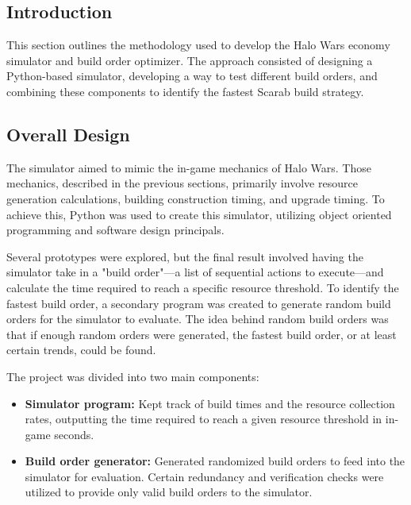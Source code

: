 \documentclass[a4paper, 12pt, english]{article}
\begin{document}
\subsection{Introduction}
This section outlines the methodology used to develop the Halo Wars economy simulator and build order optimizer. The approach consisted of designing a Python-based simulator, developing a way to test different build orders, and combining these components to identify the fastest Scarab build strategy.
\newline

\subsection{Overall Design}
The simulator aimed to mimic the in-game mechanics of Halo Wars. Those mechanics, described in the previous sections, primarily involve resource generation calculations, building construction timing, and upgrade timing. To achieve this, Python was used to create this simulator, utilizing object oriented programming and software design principals.  
\newline

Several prototypes were explored, but the final result involved having the simulator take in a "build order"—a list of sequential actions to execute—and calculate the time required to reach a specific resource threshold. To identify the fastest build order, a secondary program was created to generate random build orders for the simulator to evaluate. The idea behind random build orders was that if enough random orders were generated, the fastest build order, or at least certain trends, could be found.  
\newline

The project was divided into two main components:
\begin{itemize}
    \item \textbf{Simulator program:} Kept track of build times and the resource collection rates, outputting the time required to reach a given resource threshold in in-game seconds.
    \item \textbf{Build order generator:} Generated randomized build orders to feed into the simulator for evaluation. Certain redundancy and verification checks were utilized to provide only valid build orders to the simulator.
\end{itemize}
\end{document}
